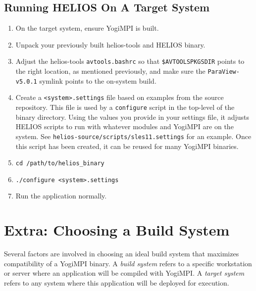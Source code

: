 \documentclass{article}
\begin{document}
\subsection{Running HELIOS On A Target System}
\begin{enumerate}
\item On the target system, ensure YogiMPI is built.
\item Unpack your previously built helios-tools and HELIOS binary.
\item Adjust the helios-tools \texttt{avtools.bashrc} so that \texttt{\$AVTOOLSPKGSDIR} points to the right location, as mentioned previously, and make sure the \texttt{ParaView-v5.0.1} symlink points to the on-system build.
\item Create a \texttt{<system>.settings} file based on examples from the source repository. This file is used by a \texttt{configure} script in the top-level of the binary directory. Using the values you provide in your settings file, it adjusts HELIOS scripts to run with whatever modules and YogiMPI are on the system. See \texttt{helios-source/scripts/sles11.settings} for an example. Once this script has been created, it can be reused for many YogiMPI binaries.
\item \texttt{cd /path/to/helios\_binary}
\item \texttt{./configure <system>.settings}
\item Run the application normally. 
\end{enumerate}

\section{Extra: Choosing a Build System}
\label{choosebuild}
Several factors are involved in choosing an ideal build system that maximizes compatibility of a YogiMPI binary. A \textit{build system} refers to a specific workstation or server where an application will be compiled with YogiMPI.  A \textit{target system} refers to any system where this application will be deployed for execution.
\end{document}
